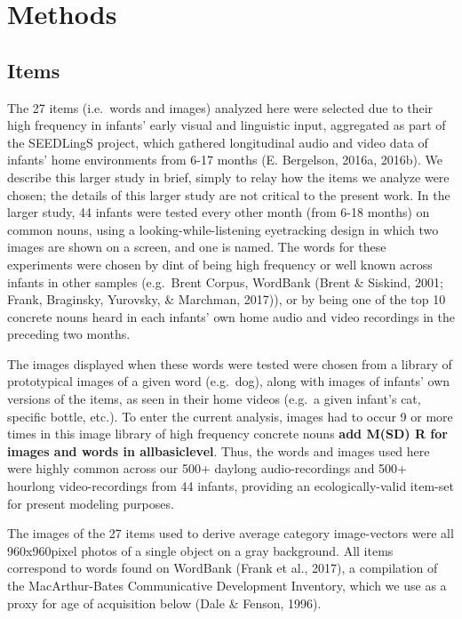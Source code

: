 \documentclass[10pt, letterpaper]{article}
\begin{document}
\section{Methods}\label{methods}

\subsection{Items}\label{items}

The 27 items (i.e.~words and images) analyzed here were selected due to
their high frequency in infants' early visual and linguistic input,
aggregated as part of the SEEDLingS project, which gathered longitudinal
audio and video data of infants' home environments from 6-17 months (E.
Bergelson, 2016a, 2016b). We describe this larger study in brief, simply
to relay how the items we analyze were chosen; the details of this
larger study are not critical to the present work. In the larger study,
44 infants were tested every other month (from 6-18 months) on common
nouns, using a looking-while-listening eyetracking design in which two
images are shown on a screen, and one is named. The words for these
experiments were chosen by dint of being high frequency or well known
across infants in other samples (e.g.~Brent Corpus, WordBank (Brent \&
Siskind, 2001; Frank, Braginsky, Yurovsky, \& Marchman, 2017)), or by
being one of the top 10 concrete nouns heard in each infants' own home
audio and video recordings in the preceding two months.

The images displayed when these words were tested were chosen from a
library of prototypical images of a given word (e.g.~dog), along with
images of infants' own versions of the items, as seen in their home
videos (e.g.~a given infant's cat, specific bottle, etc.). To enter the
current analysis, images had to occur 9 or more times in this image
library of high frequency concrete nouns \textbf{add M(SD) R for images
and words in allbasiclevel}. Thus, the words and images used here were
highly common across our 500+ daylong audio-recordings and 500+ hourlong
video-recordings from 44 infants, providing an ecologically-valid
item-set for present modeling purposes.

The images of the 27 items used to derive average category image-vectors
were all 960x960pixel photos of a single object on a gray background.
All items correspond to words found on WordBank (Frank et al., 2017), a
compilation of the MacArthur-Bates Communicative Development Inventory,
which we use as a proxy for age of acquisition below (Dale \& Fenson,
1996).
\end{document}
